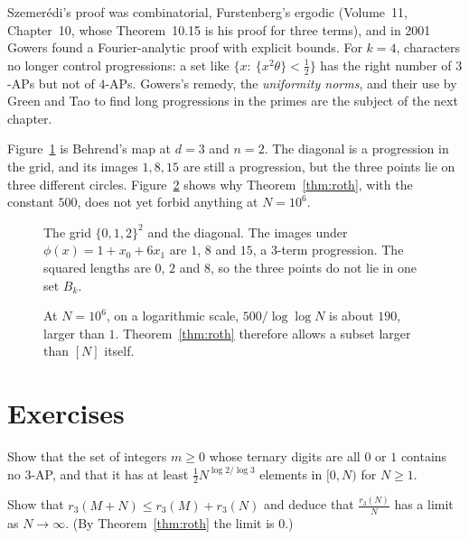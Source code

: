 Szemerédi's proof was combinatorial, Furstenberg's ergodic (Volume~11, Chapter~10, whose Theorem~10.15 is his proof for three terms), and in 2001 Gowers found a Fourier-analytic proof with explicit bounds. For $k=4$, characters no longer control progressions: a set like $\{x:\ \{x^2\theta\}<\frac12\}$ has the right number of $3$-APs but not of $4$-APs. Gowers's remedy, the \emph{uniformity norms}, and their use by Green and Tao to find long progressions in the primes are the subject of the next chapter.

Figure~\ref{fig:v14-extra-12-a} is Behrend's map at $d=3$ and $n=2$. The diagonal is a progression in the grid, and its images $1,8,15$ are still a progression, but the three points lie on three different circles. Figure~\ref{fig:v14-extra-12-b} shows why Theorem~\ref{thm:roth}, with the constant $500$, does not yet forbid anything at $N=10^6$.

\begin{figure}[ht]
\centering
{}
\caption{The grid $\{0,1,2\}^2$ and the diagonal. The images under $\phi(x)=1+x_0+6x_1$ are $1$, $8$ and $15$, a $3$-term progression. The squared lengths are $0$, $2$ and $8$, so the three points do not lie in one set $B_k$.}
\label{fig:v14-extra-12-a}
\end{figure}

\begin{figure}[ht]
\centering
{}
\caption{At $N=10^6$, on a logarithmic scale, $500/\log\log N$ is about $190$, larger than $1$. Theorem~\ref{thm:roth} therefore allows a subset larger than $[N]$ itself.}
\label{fig:v14-extra-12-b}
\end{figure}

\section{Exercises}

\begin{exercise}[$\star$]\label{ex:base3}
Show that the set of integers $m\ge0$ whose ternary digits are all $0$ or $1$ contains no $3$-AP, and that it has at least $\frac12N^{\log2/\log3}$ elements in $[0,N)$ for $N\ge1$.
\end{exercise}

\begin{exercise}[$\star$]\label{ex:fekete}
Show that $r_3(M+N)\le r_3(M)+r_3(N)$ and deduce that $\frac{r_3(N)}N$ has a limit as $N\to\infty$. (By Theorem~\ref{thm:roth} the limit is $0$.)
\end{exercise}


